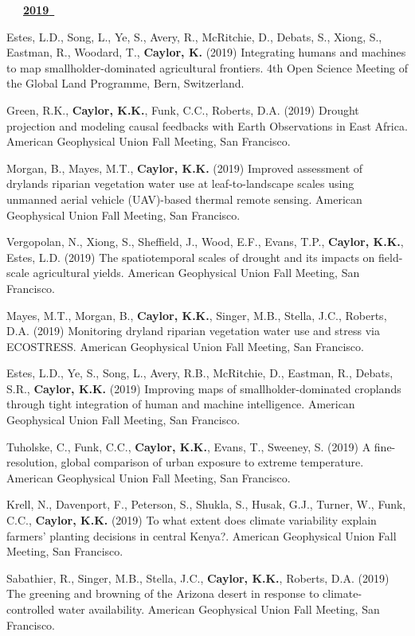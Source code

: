 \begin{etaremune}
\vspace{0.1in}
\mbox{\ \ \ \underline{\textbf{2019 }}}
\vspace{0.1in}

\item Estes, L.D., Song, L., Ye, S., Avery, R., McRitchie, D., Debats, S., Xiong, S., Eastman, R., Woodard, T., \textbf{ Caylor, K.} (2019) Integrating humans and machines to map smallholder-dominated agricultural frontiers. 4th Open Science Meeting of the Global Land Programme, Bern, Switzerland.
\item Green, R.K., \textbf{ Caylor, K.K.}, Funk, C.C., Roberts, D.A. (2019) Drought projection and modeling causal feedbacks with Earth Observations in East Africa. American Geophysical Union Fall Meeting, San Francisco.
\item Morgan, B., Mayes, M.T., \textbf{ Caylor, K.K.} (2019) Improved assessment of drylands riparian vegetation water use at leaf-to-landscape scales using unmanned aerial vehicle (UAV)-based thermal remote sensing. American Geophysical Union Fall Meeting, San Francisco.
\item Vergopolan, N., Xiong, S., Sheffield, J., Wood, E.F., Evans, T.P., \textbf{ Caylor, K.K.}, Estes, L.D. (2019) The spatiotemporal scales of drought and its impacts on field-scale agricultural yields. American Geophysical Union Fall Meeting, San Francisco.
\item Mayes, M.T., Morgan, B., \textbf{ Caylor, K.K.}, Singer, M.B., Stella, J.C., Roberts, D.A. (2019) Monitoring dryland riparian vegetation water use and stress via ECOSTRESS. American Geophysical Union Fall Meeting, San Francisco.
\item Estes, L.D., Ye, S., Song, L., Avery, R.B., McRitchie, D., Eastman, R., Debats, S.R., \textbf{ Caylor, K.K.} (2019) Improving maps of smallholder-dominated croplands through tight integration of human and machine intelligence. American Geophysical Union Fall Meeting, San Francisco.
\item Tuholske, C., Funk, C.C., \textbf{ Caylor, K.K.}, Evans, T., Sweeney, S. (2019) A fine-resolution, global comparison of urban exposure to extreme temperature. American Geophysical Union Fall Meeting, San Francisco.
\item Krell, N., Davenport, F., Peterson, S., Shukla, S., Husak, G.J., Turner, W., Funk, C.C., \textbf{ Caylor, K.K.} (2019) To what extent does climate variability explain farmers' planting decisions in central Kenya?. American Geophysical Union Fall Meeting, San Francisco.
\item Sabathier, R., Singer, M.B., Stella, J.C., \textbf{ Caylor, K.K.}, Roberts, D.A. (2019) The greening and browning of the Arizona desert in response to climate-controlled water availability. American Geophysical Union Fall Meeting, San Francisco.

\end{etaremune}

